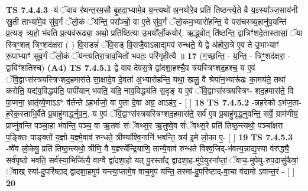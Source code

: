 \documentclass[17pt]{extarticle}
\begin{document}
                  \newline
                                \textbf{ TS 7.4.4.3} \newline
                  -यं ॅवाव र॑थन्त॒रम॒सौ बृ॒हदा॒भ्यामे॒व य॒न्त्यथो॑ अ॒नयो॑रे॒व प्रति॑ तिष्ठन्त्ये॒ते वै य॒ज्ञ्स्या᳚ञ्ज॒साय॑नी स्रु॒ती ताभ्या॑मे॒व सु॑व॒र्गं ॅलो॒कं ॅय॑न्ति॒ परा᳚ञ्चो॒ वा ए॒ते सु॑व॒र्गं ॅलो॒कम॒भ्यारो॑हन्ति॒ ये परा॑चस्त्र्य॒हानु॑प॒यन्ति॑ प्र॒त्यङ् त्र्य॒हो भ॑वति प्र॒त्यव॑रूढ्या॒ अथो॒ प्रति॑ष्ठित्या उ॒भयो᳚र्लो॒कयोर्॑. ऋ॒द्ध्वोत् ति॑ष्ठन्ति॒ द्वात्रिꣳ॑शदे॒तास्तासां॒ ॅया स्त्रिꣳ॒॒शत् त्रिꣳ॒॒शद॑क्षरा ( ) वि॒राडन्नं॑ ॅवि॒राड् वि॒राजै॒वाऽन्नाद्य॒मव॑ रुन्धते॒ ये द्वे अ॑होरा॒त्रे ए॒व ते उ॒भाभ्याꣳ॑ रू॒पाभ्याꣳ॑ सुव॒र्गं ॅलो॒कं ॅय॑न्त्यतिरा॒त्राव॒भितो॑ भवतः॒ परि॑गृहीत्यै ॥ \textbf{  17} \newline
                  \newline
                      (ग॒च्छ॒न्ति॒ - य॒न्ति॒ - त्रिꣳ॒॒शद॑क्षरा॒ - द्वाविꣳ॑शतिश्च)  \textbf{(A4)} \newline \newline
                                        \textbf{ TS 7.4.5.1} \newline
                  द्वे वाव दे॑वस॒त्रे द्वा॑दशा॒हश्चै॒व त्र॑यस्त्रिꣳशद॒हश्च॒ य ए॒वं ॅवि॒द्वाꣳस॑स्त्रयस्त्रिꣳशद॒हमास॑ते सा॒क्षादे॒व दे॒वता॑ अ॒भ्यारो॑हन्ति॒ यथा॒ खलु॒ वै श्रेया॑न॒भ्यारू॑ढः का॒मय॑ते॒ तथा॑ करोति॒ यद्य॑व॒विद्ध्य॑ति॒ पापी॑यान् भवति॒ यदि॒ नाव॒विद्ध्य॑ति स॒दृङ् य ए॒वं ॅवि॒द्वाꣳस॑स्त्रयस्त्रिꣳ- शद॒हमास॑ते॒ वि पा॒प्मना॒ भ्रातृ॑व्ये॒णाऽऽ* व॑र्तन्ते ऽह॒र्भाजो॒ वा ए॒ता दे॒वा अग्र॒ आऽह॑र॒ - [  ] \textbf{  18} \newline
                  \newline
                                \textbf{ TS 7.4.5.2} \newline
                  -न्नह॒रेको ऽभ॑ज॒ता-ह॒रेक॒स्ताभि॒र्वैते प्र॒बाहु॑गार्द्ध्नुव॒न॒. य ए॒वं ॅवि॒द्वाꣳस॑स्त्रयस्त्रिꣳशद॒हमास॑ते॒ सर्व॑ ए॒व प्र॒बाहु॑गृद्ध्नुवन्ति॒ सर्वे॒ ग्राम॑णीयं॒ प्राप्नु॑वन्ति पञ्चा॒हा भ॑वन्ति॒ पञ्च॒ वा ऋ॒तवः॑ संॅवथ्स॒र ऋ॒तुष्वे॒व सं॑ॅवथ्स॒रे प्रति॑ तिष्ठ॒न्त्यथो॒ पञ्चा᳚क्षरा प॒ङ्क्तिः पाङ्क्तो॑ य॒ज्ञो य॒ज्ञ्मे॒वाव॑ रुन्धते॒ त्रीण्या᳚श्वि॒नानि॑ भवन्ति॒ त्रय॑ इ॒मे लो॒का ए॒- [  ] \textbf{  19} \newline
                  \newline
                                \textbf{ TS 7.4.5.3} \newline
                  -ष्वे॑व लो॒केषु॒ प्रति॑ तिष्ठ॒न्त्यथो॒ त्रीणि॒ वै य॒ज्ञ्स्ये᳚न्द्रि॒याणि॒ तान्ये॒वाव॑ रुन्धते विश्व॒जिद्-भ॑वत्य॒न्नाद्य॒स्या व॑रुद्ध्यै॒ सर्व॑पृष्ठो भवति॒ सर्व॑स्या॒भिजि॑त्यै॒ वाग्वै द्वा॑दशा॒हो यत् पु॒रस्ता᳚द् द्वादशा॒ह-मु॑पे॒युरना᳚प्तां॒ ॅवाच॒-मुपे॑यु-रुप॒दासु॑कैषां॒ ॅवाख् स्या॑-दु॒परि॑ष्टाद् द्वादशा॒हमुप॑ यन्त्या॒प्तामे॒व वाच॒मुप॑ यन्ति॒ तस्मा॑-दु॒परि॑ष्टाद्-वा॒चा व॑दामो ऽवान्त॒रं - [  ] \textbf{  20} \newline
\end{document}
